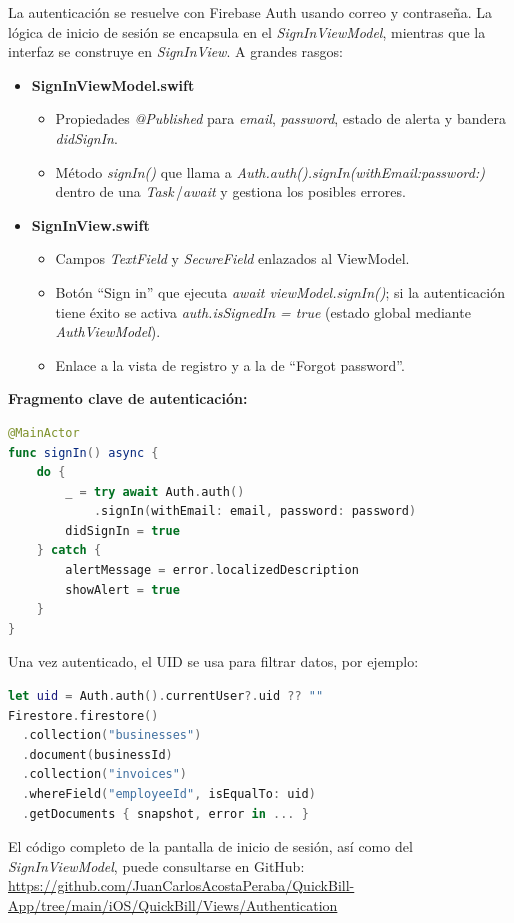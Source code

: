\begin{large}

La autenticación se resuelve con Firebase Auth usando correo y contraseña. La lógica de inicio de sesión se  encapsula en el \textit{SignInViewModel}, mientras que la interfaz se construye en \textit{SignInView}. A grandes rasgos:

\begin{itemize}
  \item \textbf{SignInViewModel.swift}
    \begin{itemize}
      \item Propiedades \textit{@Published} para \textit{email}, \textit{password}, estado de alerta y bandera \textit{didSignIn}.
      \item Método \textit{signIn()} que llama a \textit{Auth.auth().signIn(withEmail:password:)} dentro de una \textit{Task}\,/\textit{await} y gestiona los posibles errores.
    \end{itemize}
  \item \textbf{SignInView.swift}
    \begin{itemize}
      \item Campos \textit{TextField} y \textit{SecureField} enlazados al ViewModel.
      \item Botón “Sign in” que ejecuta \textit{await viewModel.signIn()}; si la autenticación tiene éxito se activa \textit{auth.isSignedIn = true} (estado global mediante \textit{AuthViewModel}).
      \item Enlace a la vista de registro y a la de “Forgot password”.
    \end{itemize}
\end{itemize}

\noindent\textbf{Fragmento clave de autenticación:}
\begin{lstlisting}[language=swift, basicstyle=\ttfamily\small, caption={SignInViewModel.signIn()}]
@MainActor
func signIn() async {
    do {
        _ = try await Auth.auth()
            .signIn(withEmail: email, password: password)
        didSignIn = true
    } catch {
        alertMessage = error.localizedDescription
        showAlert = true
    }
}
\end{lstlisting}

\noindent Una vez autenticado, el UID se usa para filtrar datos, por ejemplo:

\begin{lstlisting}[language=swift, basicstyle=\ttfamily\small, caption={Filtrado de facturas por empleado}]
let uid = Auth.auth().currentUser?.uid ?? ""
Firestore.firestore()
  .collection("businesses")
  .document(businessId)
  .collection("invoices")
  .whereField("employeeId", isEqualTo: uid)
  .getDocuments { snapshot, error in ... }
\end{lstlisting}

El código completo de la pantalla de inicio de sesión, así como del \textit{SignInViewModel}, puede consultarse en GitHub:
\url{https://github.com/JuanCarlosAcostaPeraba/QuickBill-App/tree/main/iOS/QuickBill/Views/Authentication}

\end{large}

